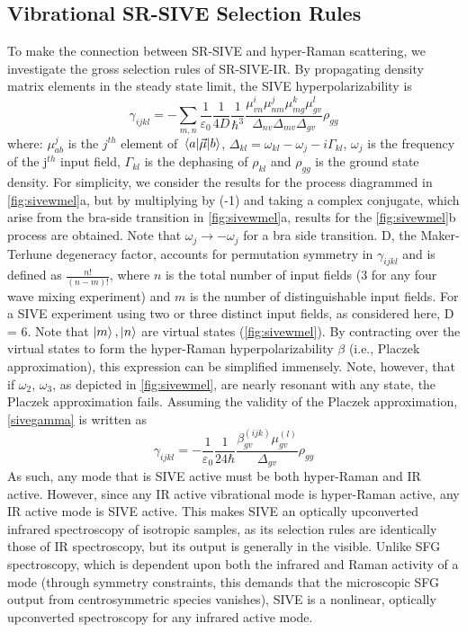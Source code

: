 \documentclass[aip, jcp, draft, onecolumn]{revtex4-2}
\begin{document}
\subsection{Vibrational SR-SIVE Selection Rules}
To make the connection between SR-SIVE and hyper-Raman scattering, we investigate the gross selection rules of SR-SIVE-IR.
By propagating density matrix elements in the steady state limit, the SIVE hyperpolarizability is \cite{RN119}
\begin{equation}\label{sivegamma}
		\gamma_{ijkl} =	- \sum_{m, n} \frac{1}{\varepsilon_0} \frac{1}{4D} \frac{1}{\hbar^3} \frac{\mu^{i}_{v n} \mu^{j}_{nm} \mu^{k}_{mg} \mu^{l}_{gv} }{\Delta_{nv} \Delta_{mv}\Delta_{gv}}  \rho_{gg}
\end{equation}
where: $\mu^{j}_{ab}$ is the $j^{th}$ element of $\mel{a}{\vec{\mu}}{b}$, $\Delta_{kl} = \omega_{kl} - \omega_{j} - i\Gamma_{kl}$, $\omega_j$ is the frequency of the j$^{th}$ input field, $\Gamma_{kl}$ is the dephasing of $\rho_{kl}$ and $\rho_{gg}$ is the ground state density.
For simplicity, we consider the results for the process diagrammed in \autoref{fig:sivewmel}a, but by multiplying by (-1) and taking a complex conjugate, which arise from the bra-side transition in \autoref{fig:sivewmel}a, results for the \autoref{fig:sivewmel}b  process are obtained.
Note that $\omega_j \rightarrow -\omega_j$ for a bra side transition.
D, the Maker-Terhune degeneracy factor, accounts for permutation symmetry in $\gamma_{ijkl}$ and is defined as $\frac{n!}{(n-m)!}$, where $n$ is the total number of input fields (3 for any four wave mixing experiment) and $m$ is the number of distinguishable input fields.\cite{RN134} 
For a SIVE experiment using two or three distinct input fields, as considered here, D = 6.
Note that $\ket{m}, \ket{n}$ are virtual states (\autoref{fig:sivewmel}).
By contracting over the virtual states to form the hyper-Raman hyperpolarizability $\beta$ (i.e., Placzek approximation), this expression can be simplified immensely.\cite{Long1970} 
Note, however, that if $\omega_2$, $\omega_3$, as depicted in \autoref{fig:sivewmel}, are nearly resonant with any state, the Placzek approximation fails. \cite{Placzek1934, Long1970}
Assuming the validity of the Placzek approximation, \autoref{sivegamma} is written as 
\begin{equation}\label{sivebeta}
	\gamma_{ijkl} =	-\frac{1}{\varepsilon_0} \frac{1}{24 \hbar}\frac{\beta^{(ijk)}_{gv} \mu^{(l)}_{gv}}{\Delta_{gv}} \rho_{gg}
\end{equation}
As such, any mode that is SIVE active must be both hyper-Raman and IR active.
However, since any IR active vibrational mode is hyper-Raman active,\cite{Cyvin1965, Andrews1978} any IR active mode is SIVE active.
This makes SIVE an optically upconverted infrared spectroscopy of isotropic samples, as its selection rules are identically those of IR spectroscopy, but its output is generally in the visible.
Unlike SFG spectroscopy, which is dependent upon both the infrared and Raman activity of a mode (through symmetry constraints, this demands that the microscopic SFG output from centrosymmetric species vanishes),\cite{Shen90, Cotton} SIVE is a nonlinear, optically upconverted spectroscopy for any infrared active mode.
\end{document}
